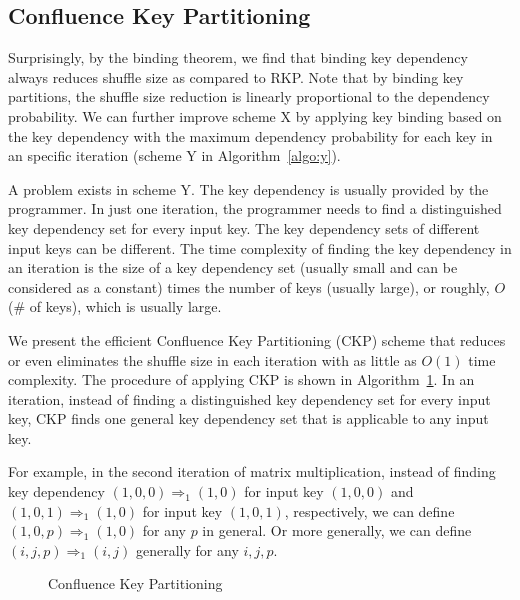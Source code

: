 \documentclass[10pt,journal,compsoc]{IEEEtran}
\makeatletter
\newcommand{\removelatexerror}{\let\@latex@error\@gobble}
\makeatother
\begin{document}
\subsection{Confluence Key Partitioning}\label{section:ckp}
Surprisingly, by the binding theorem, we find that
binding key dependency always reduces shuffle size as compared to RKP. 
Note that by binding key partitions, the shuffle size reduction is 
linearly proportional to the dependency probability. 
We can further improve scheme X 
by applying key binding based on the key dependency with the 
maximum dependency probability for each key in an specific iteration 
(scheme Y in Algorithm~\ref{algo:y}). 

A problem exists in scheme Y.
The key dependency is usually provided by the programmer.
In just one iteration, the programmer needs to find a distinguished
key dependency set for every input key. 
The key dependency sets of different input keys can be different. 
The time complexity of finding the key dependency in an iteration is the size of a key dependency set (usually small and can be considered as a constant) 
times the number of keys (usually large), 
or roughly, $O$(\# of keys), which is usually large. 


We present the efficient Confluence Key Partitioning (CKP) scheme that 
reduces or even eliminates 
the shuffle size in each iteration with as little as $O(1)$ time complexity. 
The procedure of applying CKP is shown in Algorithm~\ref{algo:CKP}.
In an iteration, instead of finding a distinguished key dependency set for 
every input key, CKP finds one general key dependency set that is applicable 
to any input key. 

For example, in the second iteration of matrix multiplication, 
instead of finding key dependency $(1, 0, 0) \Rightarrow_{1} (1, 0)$ 
for input key $(1,0,0)$ and $(1,0,1) \Rightarrow_{1} (1,0)$ 
for input key $(1,0,1)$, respectively, 
we can define $(1, 0, p) \Rightarrow_{1} (1,0)$ for any $p$ in general. 
Or more generally, we can define $(i, j, p) \Rightarrow_{1} (i, j)$ 
generally for any $i, j, p$. 

\begin{figure}[!t]
\removelatexerror

\begin{algorithm}[H]

\caption{Confluence Key Partitioning}
\label{algo:CKP}
\end{algorithm}
\end{figure}
\end{document}
